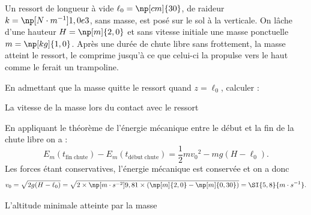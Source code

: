 Un ressort de longueur à vide $\ell_0=\np[cm]{30}$, de raideur $k=\np[N\cdot m^{-1}]{1,0e3}$, sans masse, est posé sur le sol à la verticale. On lâche d'une hauteur $H=\np[m]{2,0}$ et sans vitesse initiale une masse ponctuelle $m=\np[kg]{1,0}$. Après une durée de chute libre sans frottement, la masse atteint le ressort, le comprime jusqu'à ce que celui-ci la propulse vers le haut comme le ferait un trampoline. 

En admettant que la masse quitte le ressort quand $z=\ell_0$, calculer :

\debutEntrainement


\begin{enonce}
La vitesse de la masse lors du contact avec le ressort 
\end{enonce}


\begin{corrige}
En appliquant le théorème de l'énergie mécanique entre le début et la fin de la chute libre on a :
\[
E_m(t_\mathrm{fin \; chute})- E_m(t_\mathrm{début \; chute}) =  \frac{1}{2} m {v_0}^2 - mg (H-\ell_0).
\]
Les forces étant conservatives, l'énergie mécanique est conservée et on a donc 
\[
v_0 = \sqrt{2g (H-\ell_0)}=\sqrt{2 \times \np[m\cdot s^{-2}]{9,81} \times (\np[m]{2,0}-\np[m]{0,30})}=\SI{5,8}{m\cdot s^{-1}}.
\]
\end{corrige}




\begin{enonce}
L'altitude minimale atteinte par la masse
\end{enonce}


